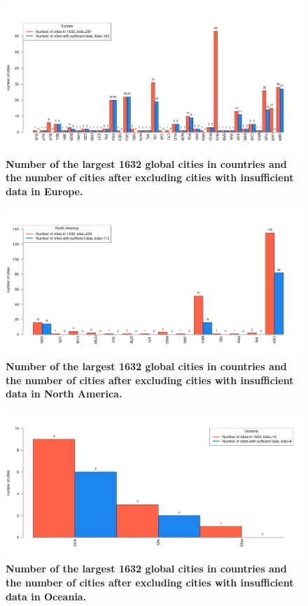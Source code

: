 \documentclass[preprint,12pt]{elsarticle}
\begin{document}
\begin{figure}
\centering
\includegraphics[trim={ 0 35 25 50 },clip,scale=0.45]{Images/Europe_cities.png}
\caption{\bf Number of the largest 1632 global cities in countries and the number of cities after excluding cities with insufficient data in Europe.}
 \label{fig:europe}
\end{figure}

\begin{figure}
\centering
\includegraphics[trim={ 0 35 25 50 },clip,scale=0.45]{Images/North America_cities.png}
\caption{\bf Number of the largest 1632 global cities in countries and the number of cities after excluding cities with insufficient data in North America.}
 \label{fig:northamerica}
\end{figure}

\begin{figure}
\centering
\includegraphics[trim={ 0 35 25 50 },clip,scale=0.45]{Images/Oceania_cities.png}
\caption{\bf Number of the largest 1632 global cities in countries and the number of cities after excluding cities with insufficient data in Oceania.}
 \label{fig:oceania}
\end{figure}
\end{document}
